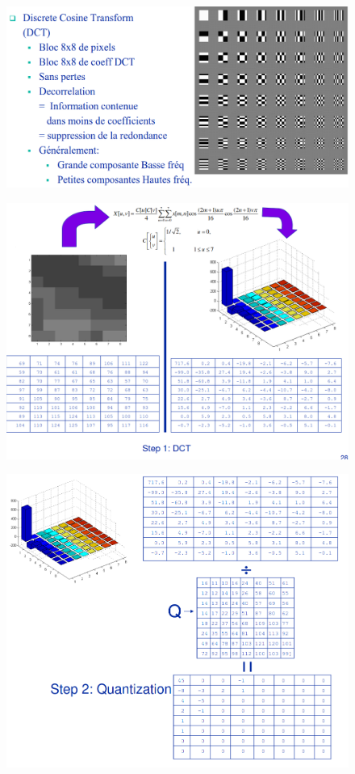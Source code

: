 			\begin{figure}[H]
				\centering
				\includegraphics[width=\textwidth]{img/Compression/DCT.png}

			\end{figure}
			\begin{figure}[H]
				\centering
				\includegraphics[width=\textwidth]{img/Compression/DCT1.png}

			\end{figure}
			\begin{figure}[H]
				\centering
				\includegraphics[width=\textwidth]{img/Compression/DCT2.png}

			\end{figure}

